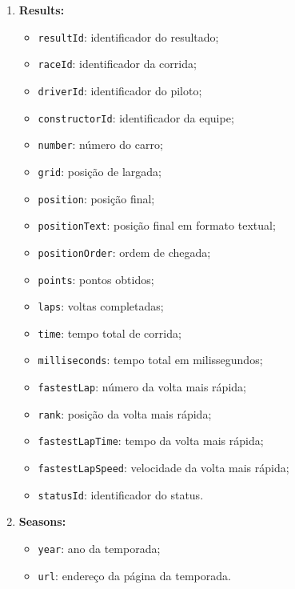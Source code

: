 \documentclass[12pt]{article}
\begin{document}
\begin{enumerate}
    \item \textbf{Results:}
    \begin{itemize}
        \item \texttt{resultId}: identificador do resultado;
        \item \texttt{raceId}: identificador da corrida;
        \item \texttt{driverId}: identificador do piloto;
        \item \texttt{constructorId}: identificador da equipe;
        \item \texttt{number}: número do carro;
        \item \texttt{grid}: posição de largada;
        \item \texttt{position}: posição final;
        \item \texttt{positionText}: posição final em formato textual;
        \item \texttt{positionOrder}: ordem de chegada;
        \item \texttt{points}: pontos obtidos;
        \item \texttt{laps}: voltas completadas;
        \item \texttt{time}: tempo total de corrida;
        \item \texttt{milliseconds}: tempo total em milissegundos;
        \item \texttt{fastestLap}: número da volta mais rápida;
        \item \texttt{rank}: posição da volta mais rápida;
        \item \texttt{fastestLapTime}: tempo da volta mais rápida;
        \item \texttt{fastestLapSpeed}: velocidade da volta mais rápida;
        \item \texttt{statusId}: identificador do status.
    \end{itemize}

    \item \textbf{Seasons:}
    \begin{itemize}
        \item \texttt{year}: ano da temporada;
        \item \texttt{url}: endereço da página da temporada.
    \end{itemize}


\end{enumerate}
\end{document}
